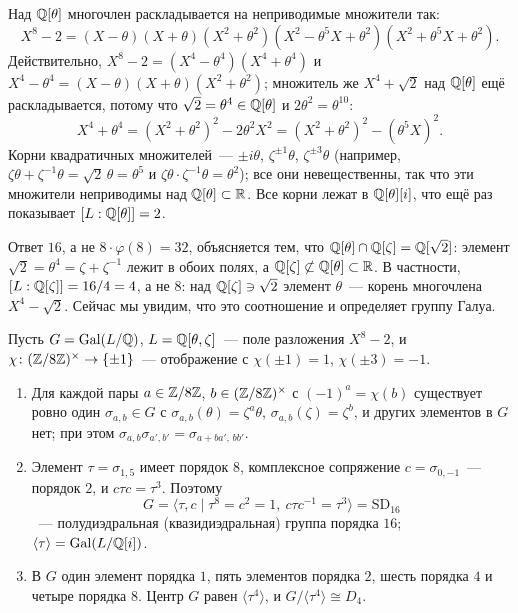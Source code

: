 Над $\mathbb Q[\theta]$ многочлен раскладывается на неприводимые множители так:
\[
X^8-2=(X-\theta)(X+\theta)(X^2+\theta^2)(X^2-\theta^5X+\theta^2)(X^2+\theta^5X+\theta^2).
\]
Действительно, $X^8-2=(X^4-\theta^4)(X^4+\theta^4)$ и $X^4-\theta^4=(X-\theta)(X+\theta)(X^2+\theta^2)$; множитель же
$X^4+\sqrt2$ над $\mathbb Q[\theta]$ ещё раскладывается, потому что $\sqrt2=\theta^4\in\mathbb Q[\theta]$ и $2\theta^2=\theta^{10}$:
\[
X^4+\theta^4=(X^2+\theta^2)^2-2\theta^2X^2=(X^2+\theta^2)^2-(\theta^5X)^2 .
\]
Корни квадратичных множителей~--- $\pm i\theta$, $\zeta^{\pm1}\theta$, $\zeta^{\pm3}\theta$ (например,
$\zeta\theta+\zeta^{-1}\theta=\sqrt2\,\theta=\theta^5$ и $\zeta\theta\cdot\zeta^{-1}\theta=\theta^2$); все они невещественны,
так что эти множители неприводимы над $\mathbb Q[\theta]\subset\mathbb R$. Все корни лежат в $\mathbb Q[\theta][i]$, что ещё раз показывает
$[L:\mathbb Q[\theta]]=2$.

Ответ $16$, а не $8\cdot\varphi(8)=32$, объясняется тем, что $\mathbb Q[\theta]\cap\mathbb Q[\zeta]=\mathbb Q[\sqrt2]$: элемент
$\sqrt2=\theta^4=\zeta+\zeta^{-1}$ лежит в обоих полях, а $\mathbb Q[\zeta]\not\subset\mathbb Q[\theta]\subset\mathbb R$. В частности,
$[L:\mathbb Q[\zeta]]=16/4=4$, а не $8$: над $\mathbb Q[\zeta]\ni\sqrt2$ элемент $\theta$~--- корень многочлена $X^4-\sqrt2$. Сейчас мы увидим, что
это соотношение и определяет группу Галуа.

\begin{proposition}[4.39l]
Пусть $G=\operatorname{Gal}(L/\mathbb Q)$, $L=\mathbb Q[\theta,\zeta]$~--- поле разложения $X^8-2$, и $\chi\colon(\mathbb Z/8\mathbb Z)^\times\to\{\pm1\}$~--- отображение с
$\chi(\pm1)=1$, $\chi(\pm3)=-1$.
\begin{enumerate}[label=\textup{(\alph*)}]
\item Для каждой пары $a\in\mathbb Z/8\mathbb Z$, $b\in(\mathbb Z/8\mathbb Z)^\times$ с $(-1)^a=\chi(b)$ существует ровно один
$\sigma_{a,b}\in G$ с $\sigma_{a,b}(\theta)=\zeta^a\theta$, $\sigma_{a,b}(\zeta)=\zeta^b$, и других элементов в $G$ нет; при
этом $\sigma_{a,b}\sigma_{a',b'}=\sigma_{a+ba',\,bb'}$.
\item Элемент $\tau=\sigma_{1,5}$ имеет порядок $8$, комплексное сопряжение $c=\sigma_{0,-1}$~--- порядок $2$, и
$c\tau c=\tau^3$. Поэтому
\[
G=\langle\tau,c\mid\tau^8=c^2=1,\ c\tau c^{-1}=\tau^3\rangle=\mathrm{SD}_{16}
\]
~--- полудиэдральная \textup(квазидиэдральная\textup) группа порядка $16$; $\langle\tau\rangle=\operatorname{Gal}(L/\mathbb Q[i])$.
\item В $G$ один элемент порядка $1$, пять элементов порядка $2$, шесть порядка $4$ и четыре порядка $8$. Центр $G$
равен $\langle\tau^4\rangle$, и $G/\langle\tau^4\rangle\cong D_4$.
\end{enumerate}
\end{proposition}

